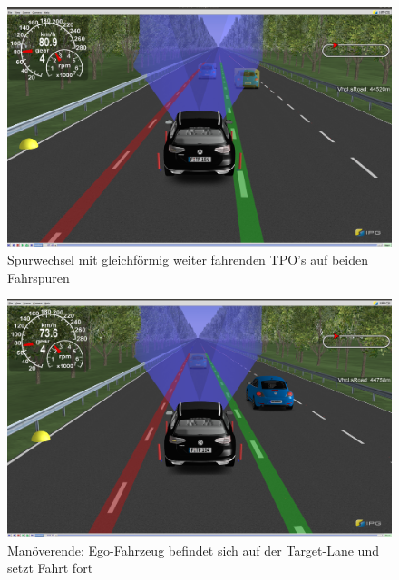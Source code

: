 \begin{figure}[!ht]
	\begin{center}
		\includegraphics[width=1.0\linewidth]{Abbildungen/bericht/carmaker_lc_part2}
		\caption{Spurwechsel mit gleichförmig weiter fahrenden TPO's auf beiden Fahrspuren}
		\label{fig.carmaker_lanechange_part2}
	\end{center}
\end{figure} 

\begin{figure}[!ht]
	\begin{center}
		\includegraphics[width=1.0\linewidth]{Abbildungen/bericht/carmaker_lc_part3}
		\caption{Manöverende: Ego-Fahrzeug befindet sich auf der Target-Lane und setzt Fahrt fort}
		\label{fig.carmaker_lanechange_part3}
	\end{center}
\end{figure} 

